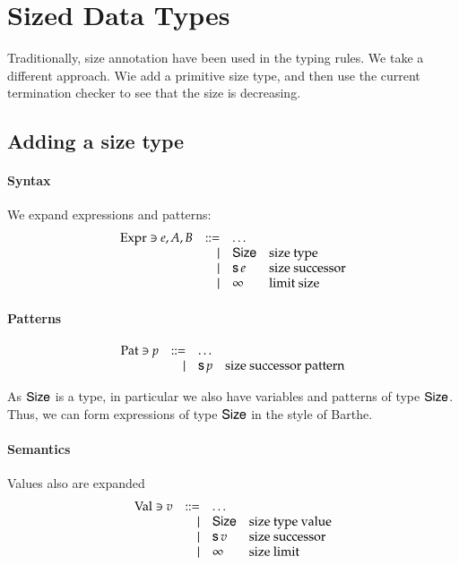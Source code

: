 \chapter{Sized Data Types}
Traditionally, size annotation have been used in the typing rules.
We take a different approach.
Wie add a primitive size type, and then use the current termination checker to see that the size is 
decreasing.

\section{Adding a size type}
\subsubsection{Syntax}
We expand expressions and patterns:
\[
\begin{array}{lrll}
\mathrm{Expr} \ni e,A,B & ::= & \ldots & \\
& \mid & \mathsf{Size} & \mbox{size type} \\
& \mid & \mathsf{s}\, e  & \mbox{size successor}\\ 
& \mid & \infty & \mbox{limit size}\\
\end{array}
\]

\subsubsection{Patterns}
\[
\begin{array}{lrll}
\mathrm{Pat} \ni p & ::= & \ldots & \\
& \mid & \mathsf{s}\, p & \mbox{size successor pattern}\\
\end{array}
\]


As $\mathsf{Size}$ is a type, in particular we also have variables and patterns of type $\mathsf{Size}$.
Thus, we can form expressions of type $\mathsf{Size}$ in the style of Barthe.

\subsubsection{Semantics}

Values also are expanded
\[
\begin{array}{lrll}
\mathrm{Val} \ni v & ::= & \ldots & \\
& \mid & \mathsf{Size} & \mbox{size type value}\\
& \mid & \mathsf{s}\, v & \mbox{size successor}\\
& \mid & \infty & \mbox{size limit}\\
\end{array}
\]

